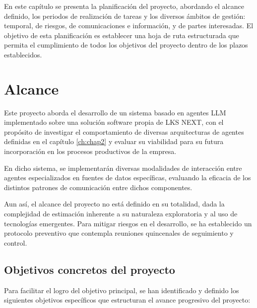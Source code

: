 En este capítulo se presenta la planificación del proyecto, abordando el alcance definido, los periodos de realización de tareas y los diversos ámbitos de gestión: temporal, de riesgos, de comunicaciones e información, y de partes interesadas. El objetivo de esta planificación es establecer una hoja de ruta estructurada que permita el cumplimiento de todos los objetivos del proyecto dentro de los plazos establecidos.

\section{Alcance}

Este proyecto aborda el desarrollo de un sistema basado en agentes LLM implementado sobre una solución software propia de LKS NEXT, con el propósito de investigar el comportamiento de diversas arquitecturas de agentes definidas en el capítulo \ref{ch:chap2} y evaluar su viabilidad para su futura incorporación en los procesos productivos de la empresa.

En dicho sistema, se implementarán diversas modalidades de interacción entre agentes especializados en fuentes de datos específicas, evaluando la eficacia de los distintos patrones de comunicación entre dichos componentes.

Aun así, el alcance del proyecto no está definido en su totalidad, dada la complejidad de estimación inherente a su naturaleza exploratoria y al uso de tecnologías emergentes. Para mitigar riesgos en el desarrollo, se ha establecido un protocolo preventivo que contempla reuniones quincenales de seguimiento y control.

\subsection{Objetivos concretos del proyecto}

Para facilitar el logro del objetivo principal, se han identificado y definido los siguientes objetivos específicos que estructuran el avance progresivo del proyecto:

